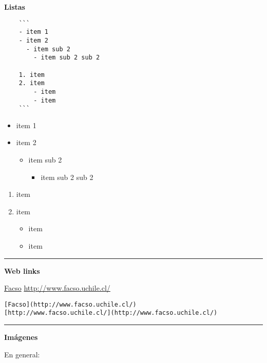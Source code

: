 \documentclass[
  11pt,
]{book}
\providecommand{\tightlist}{%
  \setlength{\itemsep}{0pt}\setlength{\parskip}{0pt}}
\begin{document}
\textbf{Listas}

\begin{verbatim}
    ```
    - item 1
    - item 2
      - item sub 2
        - item sub 2 sub 2

    1. item
    2. item
        - item
        - item
    ```
\end{verbatim}

\begin{itemize}
\tightlist
\item
  item 1
\item
  item 2

  \begin{itemize}
  \tightlist
  \item
    item sub 2

    \begin{itemize}
    \tightlist
    \item
      item sub 2 sub 2
    \end{itemize}
  \end{itemize}
\end{itemize}

\begin{enumerate}
\def\labelenumi{\arabic{enumi}.}
\tightlist
\item
  item
\item
  item

  \begin{itemize}
  \tightlist
  \item
    item
  \item
    item
  \end{itemize}
\end{enumerate}

\begin{center}\rule{0.5\linewidth}{0.5pt}\end{center}

\textbf{Web links}

\href{http://www.facso.uchile.cl/}{Facso}
\url{http://www.facso.uchile.cl/}

\begin{verbatim}
[Facso](http://www.facso.uchile.cl/)
[http://www.facso.uchile.cl/](http://www.facso.uchile.cl/)
\end{verbatim}

\begin{center}\rule{0.5\linewidth}{0.5pt}\end{center}

\textbf{Imágenes}

En general:
\end{document}
